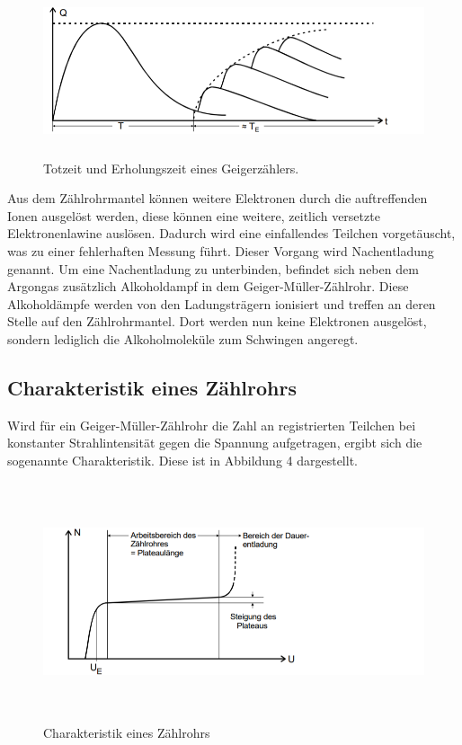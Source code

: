\begin{figure}[H]
  \centering
  \includegraphics[height=5cm]{totzeit.PNG}
  \caption{Totzeit und Erholungszeit eines Geigerzählers. \cite{sample}}
  \label{fig:totzeit}
\end{figure}

Aus dem Zählrohrmantel können weitere Elektronen durch die auftreffenden Ionen ausgelöst werden, diese können eine weitere,
zeitlich versetzte Elektronenlawine auslösen. Dadurch wird eine einfallendes Teilchen vorgetäuscht, was zu einer
fehlerhaften Messung führt. Dieser Vorgang wird Nachentladung genannt. Um eine Nachentladung zu unterbinden, befindet
sich neben dem Argongas zusätzlich Alkoholdampf in dem Geiger-Müller-Zählrohr. Diese Alkoholdämpfe
werden von den Ladungsträgern ionisiert und treffen an deren Stelle auf den Zählrohrmantel. Dort werden nun keine
Elektronen ausgelöst, sondern lediglich die Alkoholmoleküle zum Schwingen angeregt.

\subsection{Charakteristik eines Zählrohrs}

Wird für ein  Geiger-Müller-Zählrohr die Zahl an registrierten Teilchen bei konstanter Strahlintensität gegen die Spannung
aufgetragen, ergibt sich die sogenannte Charakteristik. Diese ist in Abbildung 4 dargestellt.

\begin{figure}[H]
  \centering
  \includegraphics[height=7cm]{charakteristik.PNG}
  \caption{Charakteristik eines Zählrohrs \cite{sample}}
  \label{fig:Linienspektrum}
\end{figure}

